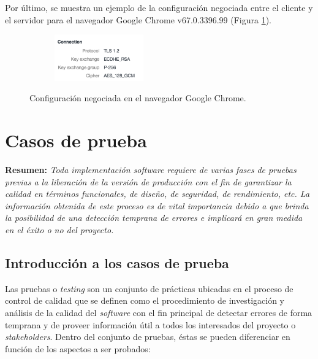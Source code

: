 \documentclass[12pt,a4paper, twoside]{report}
\begin{document}
	Por último, se muestra un ejemplo de la configuración negociada entre el cliente y el servidor para el navegador Google Chrome v67.0.3396.99 (Figura \ref{fig:handshake}). \\ 
		
	\begin{figure}[!ht]   
		\caption{Configuración negociada en el navegador Google Chrome.} 
		\begin{center} 
			\includegraphics[width=6cm,height=2cm]{Images/implement/handshake} \\
			\label{fig:handshake} 
		\end{center}  
	\end{figure}	
					
	\chapter{Casos de prueba} \label{testingChapter}
	
	\textbf{Resumen:} \textit{Toda implementación software requiere de varias fases de pruebas previas a la liberación de la versión de producción con el fin de garantizar la calidad en términos funcionales, de diseño, de seguridad, de rendimiento, etc. La información obtenida de este proceso es de vital importancia debido a que brinda la posibilidad de una detección temprana de errores e implicará en gran medida en el éxito o no del proyecto.}
	
	\section{Introducción a los casos de prueba}
	
	Las pruebas o \textit{testing} son un conjunto de prácticas ubicadas en el proceso de control de calidad que se definen como el procedimiento de investigación y análisis de la calidad del \textit{software} con el fin principal de detectar errores de forma temprana y de proveer información útil a todos los interesados del proyecto o \textit{\glspl{stakeholder}}. Dentro del conjunto de pruebas, éstas se pueden diferenciar en función de los aspectos a ser probados:
	
\end{document}
